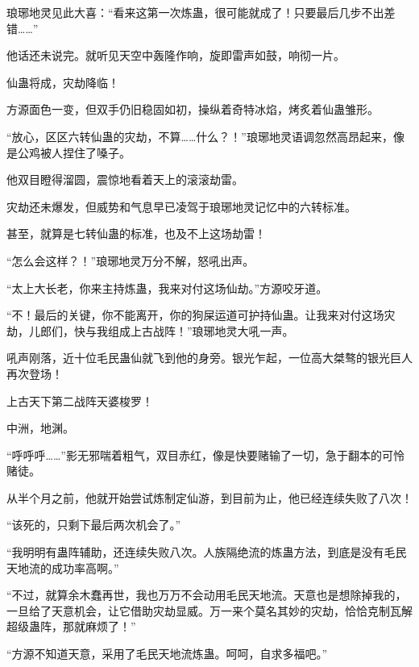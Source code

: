 \begin{this_body}
琅琊地灵见此大喜：“看来这第一次炼蛊，很可能就成了！只要最后几步不出差错……”

他话还未说完。就听见天空中轰隆作响，旋即雷声如鼓，响彻一片。

仙蛊将成，灾劫降临！

方源面色一变，但双手仍旧稳固如初，操纵着奇特冰焰，烤炙着仙蛊雏形。

“放心，区区六转仙蛊的灾劫，不算……什么？！”琅琊地灵语调忽然高昂起来，像是公鸡被人捏住了嗓子。

他双目瞪得溜圆，震惊地看着天上的滚滚劫雷。

灾劫还未爆发，但威势和气息早已凌驾于琅琊地灵记忆中的六转标准。

甚至，就算是七转仙蛊的标准，也及不上这场劫雷！

“怎么会这样？！”琅琊地灵万分不解，怒吼出声。

“太上大长老，你来主持炼蛊，我来对付这场仙劫。”方源咬牙道。

“不！最后的关键，你不能离开，你的狗屎运道可护持仙蛊。让我来对付这场灾劫，儿郎们，快与我组成上古战阵！”琅琊地灵大吼一声。

吼声刚落，近十位毛民蛊仙就飞到他的身旁。银光乍起，一位高大桀骜的银光巨人再次登场！

上古天下第二战阵天婆梭罗！

中洲，地渊。

“呼呼呼……”影无邪喘着粗气，双目赤红，像是快要赌输了一切，急于翻本的可怜赌徒。

从半个月之前，他就开始尝试炼制定仙游，到目前为止，他已经连续失败了八次！

“该死的，只剩下最后两次机会了。”

“我明明有蛊阵辅助，还连续失败八次。人族隔绝流的炼蛊方法，到底是没有毛民天地流的成功率高啊。”

“不过，就算余木蠢再世，我也万万不会动用毛民天地流。天意也是想除掉我的，一旦给了天意机会，让它借助灾劫显威。万一来个莫名其妙的灾劫，恰恰克制瓦解超级蛊阵，那就麻烦了！”

“方源不知道天意，采用了毛民天地流炼蛊。呵呵，自求多福吧。”

\end{this_body}

